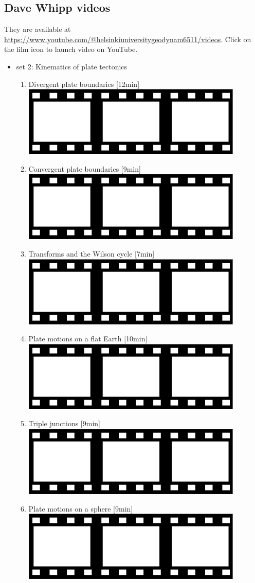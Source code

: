\subsection{Dave Whipp videos}

They are available at \url{https://www.youtube.com/@helsinkiuniversitygeodynam6511/videos}. Click on the 
film icon to launch video on YouTube.

\begin{itemize}

\item set 2: Kinematics of plate tectonics
\begin{enumerate}
\item Divergent plate boundaries [12min] \href{https://youtu.be/x3OKt5Warr4?si=YJP5GuxXPTh6SLlo}{\includegraphics[width=.8cm]{images/pictograms/film.png}}
\item Convergent plate boundaries [9min] \href{https://youtu.be/8B4PC-75a1c?si=V5huZbOi1CAxGgxG}{\includegraphics[width=.8cm]{images/pictograms/film.png}}
\item Transforms and the Wilson cycle [7min] \href{https://youtu.be/cLsFLEcfPBY?si=t5St5urowPPwXLdq}{\includegraphics[width=.8cm]{images/pictograms/film.png}}
\item Plate motions on a flat Earth [10min] \href{https://youtu.be/lZMPACABF_E?si=9l1Z-OC9ZwMqn0tv}{\includegraphics[width=.8cm]{images/pictograms/film.png}}
\item Triple junctions [9min] \href{https://youtu.be/SG2X9t0J1fc?si=Qc8JMy3LzoDDzZpL}{\includegraphics[width=.8cm]{images/pictograms/film.png}}
\item Plate motions on a sphere [9min] \href{https://youtu.be/Fifg4O0fs2E?si=LB6NoWUioEEa9XZB}{\includegraphics[width=.8cm]{images/pictograms/film.png}}
\end{enumerate}


\end{itemize}
